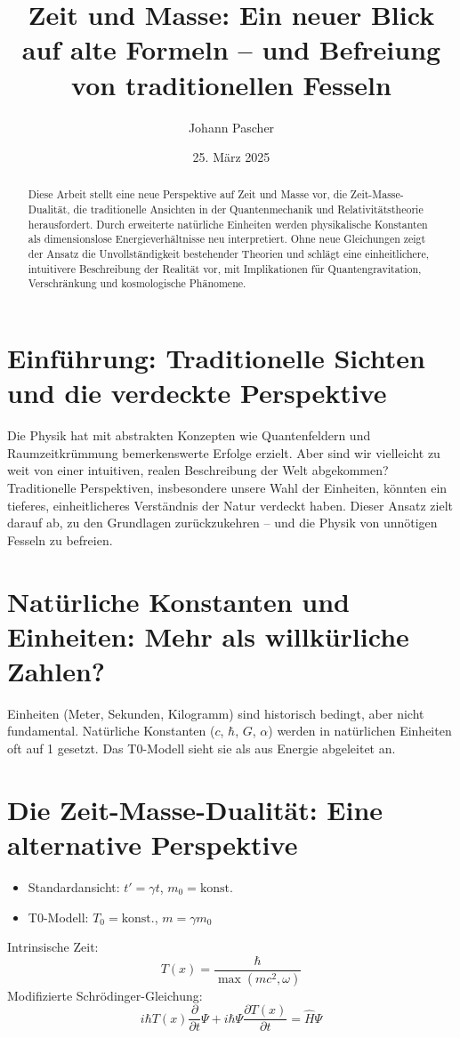 \documentclass{article}
\title{Zeit und Masse: Ein neuer Blick auf alte Formeln – und Befreiung von traditionellen Fesseln}
\author{Johann Pascher}
\date{25. März 2025}
\newcommand{\Tfield}{T(x)}
\begin{document}
	
	\maketitle
	
	\begin{abstract}
		Diese Arbeit stellt eine neue Perspektive auf Zeit und Masse vor, die Zeit-Masse-Dualität, die traditionelle Ansichten in der Quantenmechanik und Relativitätstheorie herausfordert. Durch erweiterte natürliche Einheiten werden physikalische Konstanten als dimensionslose Energieverhältnisse neu interpretiert. Ohne neue Gleichungen zeigt der Ansatz die Unvollständigkeit bestehender Theorien und schlägt eine einheitlichere, intuitivere Beschreibung der Realität vor, mit Implikationen für Quantengravitation, Verschränkung und kosmologische Phänomene.
	\end{abstract}
	
	\tableofcontents
	\newpage
	
	\section{Einführung: Traditionelle Sichten und die verdeckte Perspektive}
	Die Physik hat mit abstrakten Konzepten wie Quantenfeldern und Raumzeitkrümmung bemerkenswerte Erfolge erzielt. Aber sind wir vielleicht zu weit von einer intuitiven, realen Beschreibung der Welt abgekommen? Traditionelle Perspektiven, insbesondere unsere Wahl der Einheiten, könnten ein tieferes, einheitlicheres Verständnis der Natur verdeckt haben. Dieser Ansatz zielt darauf ab, zu den Grundlagen zurückzukehren – und die Physik von unnötigen Fesseln zu befreien.
	
	\section{Natürliche Konstanten und Einheiten: Mehr als willkürliche Zahlen?}
	Einheiten (Meter, Sekunden, Kilogramm) sind historisch bedingt, aber nicht fundamental. Natürliche Konstanten (\( c \), \( \hbar \), \( G \), \( \alpha \)) werden in natürlichen Einheiten oft auf 1 gesetzt. Das T0-Modell sieht sie als aus Energie abgeleitet an.
	
	\section{Die Zeit-Masse-Dualität: Eine alternative Perspektive}
	\begin{itemize}
		\item Standardansicht: \( t' = \gamma t \), \( m_0 = \text{konst.} \)
		\item T0-Modell: \( T_0 = \text{konst.} \), \( m = \gamma m_0 \)
	\end{itemize}
	Intrinsische Zeit:
	\begin{equation}
		\Tfield = \frac{\hbar}{\max(m c^2, \omega)}
	\end{equation}
	Modifizierte Schrödinger-Gleichung:
	\begin{equation}
		i\hbar \Tfield \frac{\partial}{\partial t} \Psi + i\hbar \Psi \frac{\partial \Tfield}{\partial t} = \hat{H} \Psi
	\end{equation}
	
\end{document}
